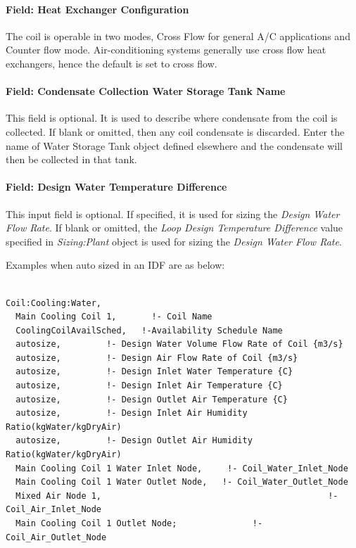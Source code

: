 \paragraph{Field: Heat Exchanger Configuration}\label{field-heat-exchanger-configuration-000}

The coil is operable in two modes, Cross Flow for general A/C applications and Counter flow mode. Air-conditioning systems generally use cross flow heat exchangers, hence the default is set to cross flow.

\paragraph{Field: Condensate Collection Water Storage Tank Name}\label{field-condensate-collection-water-storage-tank-name}

This field is optional. It is used to describe where condensate from the coil is collected. If blank or omitted, then any coil condensate is discarded. Enter the name of Water Storage Tank object defined elsewhere and the condensate will then be collected in that tank.

\paragraph{Field: Design Water Temperature Difference}\label{field-design-water-temperature-difference}
This input field is optional. If specified, it is used for sizing the \textit{Design Water Flow Rate}. If blank or omitted, the \textit{Loop Design Temperature Difference} value specified in \textit{Sizing:Plant} object is used for sizing the \textit{Design Water Flow Rate}.

Examples when auto sized in an IDF are as below:

\begin{lstlisting}

Coil:Cooling:Water,
  Main Cooling Coil 1,       !- Coil Name
  CoolingCoilAvailSched,   !-Availability Schedule Name
  autosize,         !- Design Water Volume Flow Rate of Coil {m3/s}
  autosize,         !- Design Air Flow Rate of Coil {m3/s}
  autosize,         !- Design Inlet Water Temperature {C}
  autosize,         !- Design Inlet Air Temperature {C}
  autosize,         !- Design Outlet Air Temperature {C}
  autosize,         !- Design Inlet Air Humidity Ratio(kgWater/kgDryAir)
  autosize,         !- Design Outlet Air Humidity Ratio(kgWater/kgDryAir)
  Main Cooling Coil 1 Water Inlet Node,     !- Coil_Water_Inlet_Node
  Main Cooling Coil 1 Water Outlet Node,   !- Coil_Water_Outlet_Node
  Mixed Air Node 1,                                             !- Coil_Air_Inlet_Node
  Main Cooling Coil 1 Outlet Node;               !- Coil_Air_Outlet_Node
\end{lstlisting}

